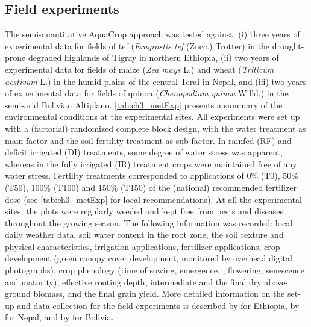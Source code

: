 \subsection{Field experiments}
The semi-quantitative AquaCrop approach was tested against: (i) three years of experimental data for fields of tef (\textit{Eragrostis tef} (Zucc.) Trotter) in the drought-prone degraded highlands of Tigray in northern Ethiopia, (ii) two years of experimental data for fields of maize (\textit{Zea mays} L.) and wheat (\textit{Triticum aestivum} L.) in the humid plains of the central Terai in Nepal, and (iii) two years of experimental data for fields of quinoa (\textit{Chenopodium quinoa} Willd.)  in the semi-arid Bolivian Altiplano. \autoref{tab:ch3_metExp} presents a summary of the environmental conditions at the experimental sites. All experiments were set up with a (factorial) randomized complete block design, with the water treatment as main factor and the soil fertility treatment as sub-factor. In rainfed (RF) and deficit irrigated (DI) treatments, some degree of water stress was apparent, whereas in the fully irrigated (IR) treatment crops were maintained free of any water stress. Fertility treatments corresponded to applications of 0\% (T0), 50\% (T50), 100\% (T100) and 150\% (T150) of the (national) recommended fertilizer dose (see \autoref{tab:ch3_metExp} for local recommendations). At all the experimental sites, the plots were regularly weeded and kept free from pests and diseases throughout the growing season. The following information was recorded: local daily weather data, soil water content in the root zone, the soil texture and physical characteristics, irrigation applications, fertilizer applications, crop development (green canopy cover development, monitored by overhead digital photographs), crop phenology (time of sowing, emergence, \CCx, flowering, senescence and maturity), effective rooting depth, intermediate and the final dry above-ground biomass, and the final grain yield. More detailed information on the set-up and data collection for the field experiments is described by \textcite{tsegay2012} for Ethiopia, by \textcite{shrestha2013} for Nepal, and by \textcite{geerts2008a} for Bolivia.

